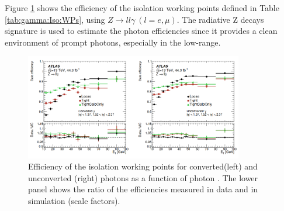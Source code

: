 Figure \ref{fig:gamma:Iso:Eff} shows the efficiency of the isolation working points defined in Table \ref{tab:gamma:Iso:WPs}, using $Z\rightarrow ll\gamma \ (l=e,\mu)$. The radiative Z decays signature is used to estimate the photon efficiencies since it provides a clean environment of prompt photons, especially in the low-\eT range. 
\begin{figure}[htbp]
    \centering
    \includegraphics[width=0.85\textwidth]{Ch3/Img/Photon_Iso_Eff.png}
    \caption{Efficiency of the isolation working points for converted(left) and unconverted (right) photons as a function of photon \eT. The lower panel shows the ratio of the efficiencies measured in data and in simulation (scale factors).}
    \label{fig:gamma:Iso:Eff}
\end{figure}
